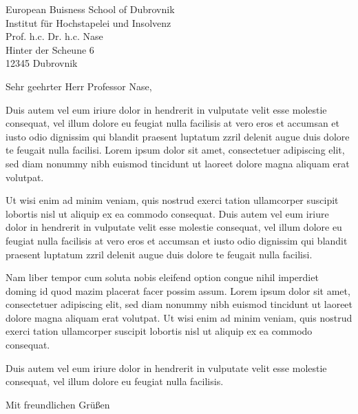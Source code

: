\documentclass[11pt,a4paper,moderncvx,fromphone=true,enlargefirstpage,firstfoot=false,foldmarks=false,DIV=10]{scrlttr2}
\begin{document}


\setlength{\parskip}{1ex}
\setlength{\parindent}{0pt}


\begin{letter}{	
European Buisness School of Dubrovnik \\
Institut für Hochstapelei und Insolvenz \\
Prof. h.c. Dr. h.c.  Nase \\
Hinter der Scheune 6 \\
12345 Dubrovnik}

\opening{Sehr geehrter Herr Professor Nase,}

Duis autem vel eum iriure dolor in hendrerit in vulputate velit esse molestie consequat, vel illum dolore eu feugiat nulla facilisis at vero eros et accumsan et iusto odio dignissim qui blandit praesent luptatum zzril delenit augue duis dolore te feugait nulla facilisi. Lorem ipsum dolor sit amet, consectetuer adipiscing elit, sed diam nonummy nibh euismod tincidunt ut laoreet dolore magna aliquam erat volutpat.

Ut wisi enim ad minim veniam, quis nostrud exerci tation ullamcorper suscipit lobortis nisl ut aliquip ex ea commodo consequat. Duis autem vel eum iriure dolor in hendrerit in vulputate velit esse molestie consequat, vel illum dolore eu feugiat nulla facilisis at vero eros et accumsan et iusto odio dignissim qui blandit praesent luptatum zzril delenit augue duis dolore te feugait nulla facilisi.

Nam liber tempor cum soluta nobis eleifend option congue nihil imperdiet doming id quod mazim placerat facer possim assum. Lorem ipsum dolor sit amet, consectetuer adipiscing elit, sed diam nonummy nibh euismod tincidunt ut laoreet dolore magna aliquam erat volutpat. Ut wisi enim ad minim veniam, quis nostrud exerci tation ullamcorper suscipit lobortis nisl ut aliquip ex ea commodo consequat.

Duis autem vel eum iriure dolor in hendrerit in vulputate velit esse molestie consequat, vel illum dolore eu feugiat nulla facilisis.

\closing{Mit freundlichen Grüßen}


\end{letter}
\end{document}
